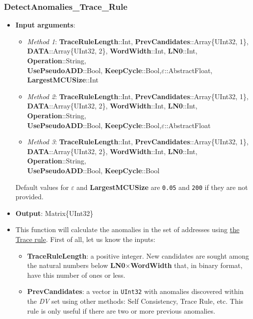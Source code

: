 \subsubsection*{DetectAnomalies\_Trace\_Rule}\label{Fun:DetectAnomaliesTraceRule}
 \begin{itemize}
	 \item \textbf{Input arguments}: 
	 \begin{itemize}
	 	\item \textit{Method 1}: \textbf{TraceRuleLength}::Int, \textbf{PrevCandidates}::Array\{UInt32, 1\}, \\ \textbf{DATA}::Array\{UInt32, 2\}, \textbf{WordWidth}::Int, \textbf{LN0}::Int,  \textbf{Operation}::String, \\ \textbf{UsePseudoADD}::Bool, \textbf{KeepCycle}::Bool,\textbf{\(\varepsilon\)}::AbstractFloat, \textbf{LargestMCUSize}::Int
	 	\item \textit{Method 2}: \textbf{TraceRuleLength}::Int, 
	 	\textbf{PrevCandidates}::Array\{UInt32, 1\}, \\ \textbf{DATA}::Array\{UInt32, 2\}, \textbf{WordWidth}::Int, \textbf{LN0}::Int,  \textbf{Operation}::String, \\ \textbf{UsePseudoADD}::Bool, \textbf{KeepCycle}::Bool,\textbf{\(\varepsilon\)}::AbstractFloat
	 	\item \textit{Method 3}: \textbf{TraceRuleLength}::Int,
	 	\textbf{PrevCandidates}::Array\{UInt32, 1\}, \\ \textbf{DATA}::Array\{UInt32, 2\}, \textbf{WordWidth}::Int, \textbf{LN0}::Int,  \textbf{Operation}::String, \\ \textbf{UsePseudoADD}::Bool, \textbf{KeepCycle}::Bool
	 \end{itemize}
	 Default values for \textbf{\(\varepsilon\)} and \textbf{LargestMCUSize} are \texttt{0.05} and \texttt{200} if they are not provided.
	 \item \textbf{Output}: Matrix\{UInt32\}
	 \item This function will calculate the anomalies in the set of addresses using \hyperref[Subsec:TraceRule]{the Trace rule}. 
	 First of all, let us know the inputs:
	 \begin{itemize}
	 	\item \textbf{TraceRuleLength}: a positive integer. New candidates are sought among the natural numbers below \textbf{LN0}\(\times\)\textbf{WordWidth} that, in binary format, have this number of ones or less.
	 	
	 	\item \textbf{PrevCandidates}: a vector in \texttt{UInt32} with anomalies discovered within the \textit{DV} set using other methods: Self Consistency, Trace Rule, etc. This rule is only useful if there are two or more previous anomalies. 
	 	

\end{itemize}
\end{itemize}
